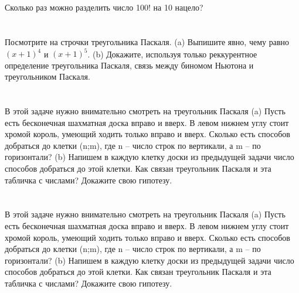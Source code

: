 \documentclass[a4paper,10pt]{article}%
\begin{document}
%
\section{}%
\label{sec:}%
Сколько раз можно разделить число 100! на 10 нацело?%
%
\iffalse%
Автор: Дарья Анзон%
Дата: 01{-}07{-}2017%
Название: None%
Подсказка: \textbackslash{}\textbackslash{}%
nan%
\fi

%
\section{}%
\label{sec:}%
Посмотрите на строчки треугольника Паскаля.
(a) Выпишите явно, чему равно $(x + 1)^4$ и $(x + 1)^5$.
(b) Докажите, используя только реккурентное определение треугольника Паскаля, связь между биномом Ньютона и треугольником Паскаля.%
%
\iffalse%
Автор: Павел Минаев%
Дата: 07{-}10{-}2017%
Название: None%
Подсказка: \textbackslash{}\textbackslash{}%
nan%
\fi

%
\section{}%
\label{sec:}%
В этой задаче нужно внимательно смотреть на треугольник Паскаля
(a) Пусть есть бесконечная шахматная доска вправо и вверх. В левом нижнем углу стоит хромой король,
умеющий ходить только вправо и вверх. Сколько есть способов добраться до клетки (n;m), где n – число
строк по вертикали, а m – по горизонтали?
(b) Напишем в каждую клетку доски из предыдущей задачи число способов добраться до этой клетки. Как
связан треугольник Паскаля и эта табличка с числами? Докажите свою гипотезу.%
%
\iffalse%
Автор: Павел Минаев%
Дата: 07{-}10{-}2017%
Название: None%
Подсказка: \textbackslash{}\textbackslash{}%
nan%
\fi

%
\section{}%
\label{sec:}%
В этой задаче нужно внимательно смотреть на треугольник Паскаля
(a) Пусть есть бесконечная шахматная доска вправо и вверх. В левом нижнем углу стоит хромой король,
умеющий ходить только вправо и вверх. Сколько есть способов добраться до клетки (n;m), где n – число
строк по вертикали, а m – по горизонтали?
(b) Напишем в каждую клетку доски из предыдущей задачи число способов добраться до этой клетки. Как
связан треугольник Паскаля и эта табличка с числами? Докажите свою гипотезу.%
%
\iffalse%
Автор: Павел Минаев%
Дата: 07{-}10{-}2017%
Название: None%
Подсказка: \textbackslash{}\textbackslash{}%
nan%
\fi
\end{document}
